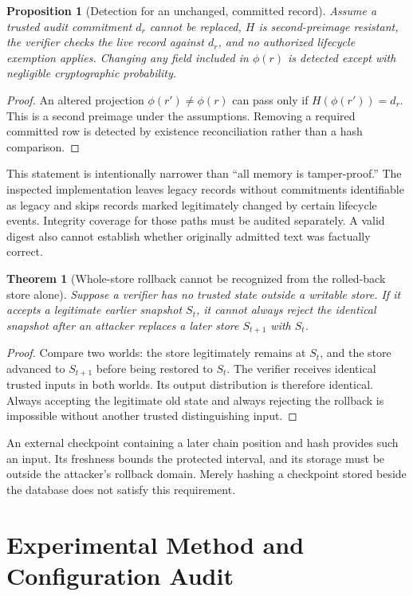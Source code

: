 \documentclass[10pt,twocolumn]{article}
\newtheorem{proposition}{Proposition}
\newtheorem{theorem}{Theorem}
\begin{document}
\begin{proposition}[Detection for an unchanged, committed record]
Assume a trusted audit commitment $d_r$ cannot be replaced, $H$ is second-preimage resistant, the verifier checks the live record against $d_r$, and no authorized lifecycle exemption applies. Changing any field included in $\phi(r)$ is detected except with negligible cryptographic probability.
\end{proposition}
\begin{proof}
An altered projection $\phi(r')\neq\phi(r)$ can pass only if $H(\phi(r'))=d_r$. This is a second preimage under the assumptions. Removing a required committed row is detected by existence reconciliation rather than a hash comparison.
\end{proof}
This statement is intentionally narrower than ``all memory is tamper-proof.'' The inspected implementation leaves legacy records without commitments identifiable as legacy and skips records marked legitimately changed by certain lifecycle events. Integrity coverage for those paths must be audited separately. A valid digest also cannot establish whether originally admitted text was factually correct.

\begin{theorem}[Whole-store rollback cannot be recognized from the rolled-back store alone]
Suppose a verifier has no trusted state outside a writable store. If it accepts a legitimate earlier snapshot $S_t$, it cannot always reject the identical snapshot after an attacker replaces a later store $S_{t+1}$ with $S_t$.
\end{theorem}
\begin{proof}
Compare two worlds: the store legitimately remains at $S_t$, and the store advanced to $S_{t+1}$ before being restored to $S_t$. The verifier receives identical trusted inputs in both worlds. Its output distribution is therefore identical. Always accepting the legitimate old state and always rejecting the rollback is impossible without another trusted distinguishing input.
\end{proof}
An external checkpoint containing a later chain position and hash provides such an input. Its freshness bounds the protected interval, and its storage must be outside the attacker's rollback domain. Merely hashing a checkpoint stored beside the database does not satisfy this requirement.

\section{Experimental Method and Configuration Audit}
\label{sec:methods}
\end{document}
